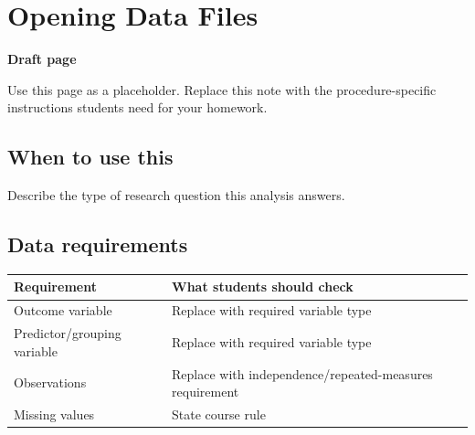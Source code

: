 \documentclass[
  letterpaper,
  DIV=11,
  numbers=noendperiod]{scrreprt}
\newcounter{none} %
\begin{document}
\chapter{Opening Data Files}\label{opening-data-files}

\begin{tcolorbox}[enhanced jigsaw, arc=.35mm, bottomrule=.15mm, breakable, colback=white, colframe=quarto-callout-note-color-frame, left=2mm, leftrule=.75mm, opacityback=0, rightrule=.15mm, toprule=.15mm]
\begin{minipage}[t]{5.5mm}
\textcolor{quarto-callout-note-color}{\faInfo}
\end{minipage}%
\begin{minipage}[t]{\textwidth - 5.5mm}

\vspace{-3mm}\textbf{Draft page}\vspace{3mm}

Use this page as a placeholder. Replace this note with the
procedure-specific instructions students need for your homework.

\end{minipage}%
\end{tcolorbox}

\section{When to use this}\label{when-to-use-this-1}

Describe the type of research question this analysis answers.

\section{Data requirements}\label{data-requirements-1}

{\def\LTcaptype{none} %
\begin{longtable}[]{@{}
  >{\raggedright\arraybackslash}p{}
  >{\raggedright\arraybackslash}p{}@{}}
\toprule\noalign{}
\begin{minipage}[b]{\linewidth}\raggedright
Requirement
\end{minipage} & \begin{minipage}[b]{\linewidth}\raggedright
What students should check
\end{minipage} \\
\midrule\noalign{}
\endhead
\bottomrule\noalign{}
\endlastfoot
Outcome variable & Replace with required variable type \\
Predictor/grouping variable & Replace with required variable type \\
Observations & Replace with independence/repeated-measures
requirement \\
Missing values & State course rule \\
\end{longtable}
}
\end{document}

